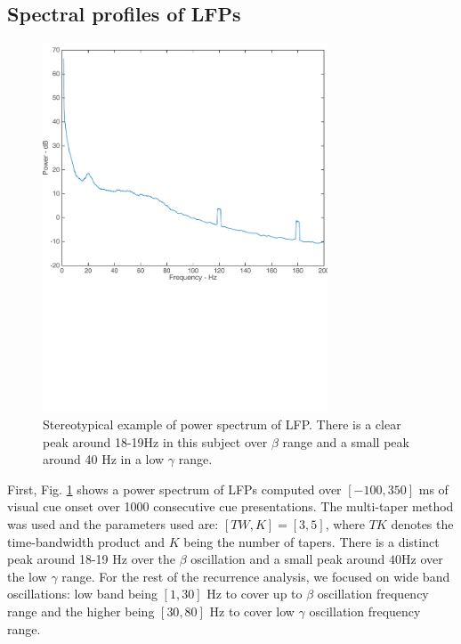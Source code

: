 \documentclass[letterpaper, 9pt, conference]{ieeeconf}
\begin{document}
\subsection{Spectral profiles of LFPs}
\begin{figure}[ht!]
\begin{minipage}{20pc}
\includegraphics[width=20pc]{PSD_v1.pdf}
\caption{\label{fig:psd}Stereotypical example of power spectrum of LFP. There is a clear peak around 18-19Hz in this subject over $\beta$ range and  a small peak around 40 Hz in a low $\gamma$ range.}
\end{minipage}\hspace{2pc}
\end{figure}

First, Fig. \ref{fig:psd} shows a power spectrum of LFPs computed over $[-100, 350]$ ms of visual cue onset over 1000 consecutive cue presentations. The multi-taper method was used and the parameters used are: $[TW, K]=[3, 5]$, where $TK$ denotes the time-bandwidth product and $K$ being the number of tapers. There is a distinct peak around 18-19 Hz over the $\beta$ oscillation and a small peak around $40$Hz over the low $\gamma$ range. For the rest of the recurrence analysis, we focused on wide band oscillations: low band being $[1, 30]$ Hz to cover up to $\beta$ oscillation frequency range and the higher being $[30, 80]$ Hz to cover low $\gamma$ oscillation frequency range. 
\end{document}
